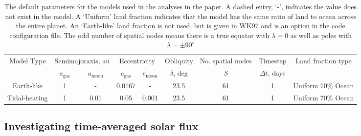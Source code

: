 \documentclass[12pt, onecolumn]{revtex4-2}    %
\begin{document}
\begin{table*}
    \begin{tabular}{|c|c|c|c|c|c|c|c|c|}
        \hline
        \multirow{2}{*}{Model Type} & \multicolumn{2}{|c|}{Semimajoraxis, au} & \multicolumn{2}{|c|}{Eccentricity} & Obliquity        & No. spatial nodes & Timestep      & \multirow{2}{*}{Land fraction type}                                         \\
        \cline{2-5}
                                    & $a_{\text{gas}}$                        & $a_{\text{moon}}$                  & $e_{\text{gas}}$ & $e_{\text{moon}}$ & $\delta$, deg & $S$                                 & $\Delta t$, days &                    \\
        \hline
        Earth-like                  & 1                                       & -                                  & 0.0167           & -                 & 23.5          & 61                                  & 1                & Uniform 70\% Ocean \\
        \hline
        Tidal-heating               & 1                                       & 0.01                               & 0.05             & 0.001             & 23.5          & 61                                  & 1                & Uniform 70\% Ocean \\
        \hline
    \end{tabular}
    \caption{The default parameters for the models used in the analyses in the paper.
        A dashed entry, `-', indicates the value does not exist in the model.
        A `Uniform' land fraction indicates that the model has the same ratio of land to ocean across the entire planet.
        An `Earth-like' land fraction is not used, but is given in WK97 \cite{WK97} and is an option in the code configuration file.
        The odd number of spatial nodes means there is a true equator with $\lambda = 0$ as well as poles with $\lambda = \pm 90^{\circ}$}
    \label{tab:default_params}
\end{table*}

\subsection{Investigating time-averaged solar flux} \label{ssec:tavgsolflux}
\end{document}
